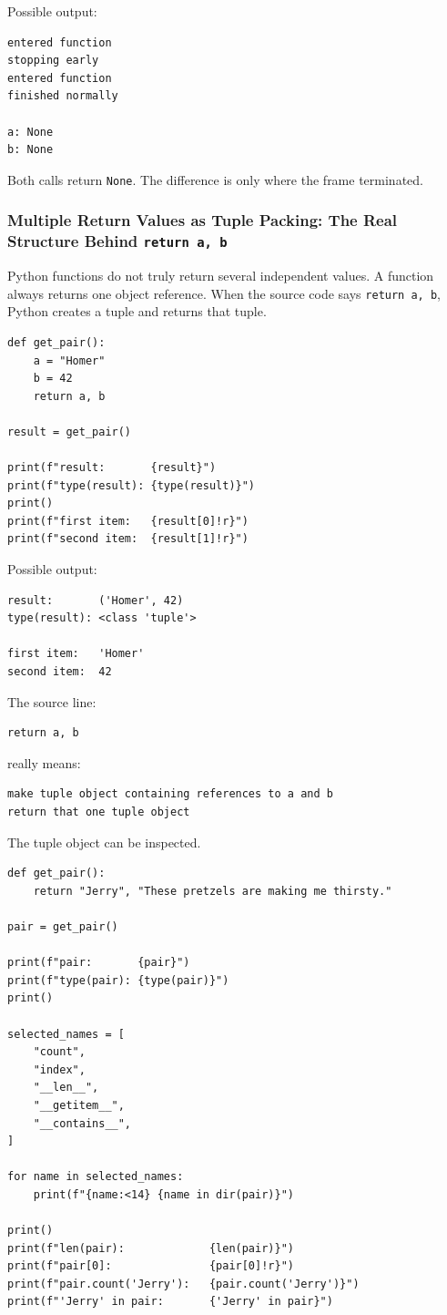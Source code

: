 Possible output:

\begin{verbatim}
entered function
stopping early
entered function
finished normally

a: None
b: None
\end{verbatim}

Both calls return \texttt{None}. The difference is only where the frame terminated.

\subsubsection{Multiple Return Values as Tuple Packing: The Real Structure Behind \texttt{return a, b}}

Python functions do not truly return several independent values. A function always returns one object reference. When the source code says \texttt{return a, b}, Python creates a tuple and returns that tuple.

\begin{verbatim}
def get_pair():
    a = "Homer"
    b = 42
    return a, b

result = get_pair()

print(f"result:       {result}")
print(f"type(result): {type(result)}")
print()
print(f"first item:   {result[0]!r}")
print(f"second item:  {result[1]!r}")
\end{verbatim}

Possible output:

\begin{verbatim}
result:       ('Homer', 42)
type(result): <class 'tuple'>

first item:   'Homer'
second item:  42
\end{verbatim}

The source line:

\begin{verbatim}
return a, b
\end{verbatim}

really means:

\begin{verbatim}
make tuple object containing references to a and b
return that one tuple object
\end{verbatim}

The tuple object can be inspected.

\begin{verbatim}
def get_pair():
    return "Jerry", "These pretzels are making me thirsty."

pair = get_pair()

print(f"pair:       {pair}")
print(f"type(pair): {type(pair)}")
print()

selected_names = [
    "count",
    "index",
    "__len__",
    "__getitem__",
    "__contains__",
]

for name in selected_names:
    print(f"{name:<14} {name in dir(pair)}")

print()
print(f"len(pair):             {len(pair)}")
print(f"pair[0]:               {pair[0]!r}")
print(f"pair.count('Jerry'):   {pair.count('Jerry')}")
print(f"'Jerry' in pair:       {'Jerry' in pair}")
\end{verbatim}

